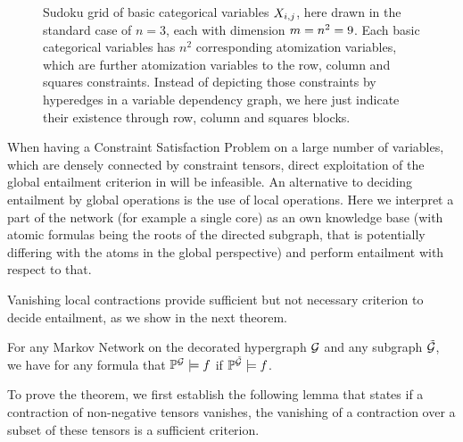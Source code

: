 \begin{example}[Sudoku]
    \begin{figure}
        \begin{center}
            
        \end{center}
        \caption{
            Sudoku grid of basic categorical variables $X_{i,j}$, here drawn in the standard case of $n=3$, each with dimension $m=n^2=9$.
            Each basic categorical variables has $n^2$ corresponding atomization variables, which are further atomization variables to the row, column and squares constraints.
            Instead of depicting those constraints by hyperedges in a variable dependency graph, we here just indicate their existence through row, column and squares blocks.
        }\label{fig:sudokuGrid}
    \end{figure}
\end{example}




\label{subsec:LocalEntailment}

When having a Constraint Satisfaction Problem on a large number of variables, which are densely connected by constraint tensors, direct exploitation of the global entailment criterion in  will be infeasible.
An alternative to deciding entailment by global operations is the use of local operations.
Here we interpret a part of the network (for example a single core) as an own knowledge base (with atomic formulas being the roots of the directed subgraph, that is potentially differing with the atoms in the global perspective) and perform entailment with respect to that.


Vanishing local contractions provide sufficient but not necessary criterion to decide entailment, as we show in the next theorem.

\begin{theorem}
    \label{the:monotonEntailment}
    For any Markov Network on the decorated hypergraph $\mathcal{G}$ and any subgraph $\tilde{\mathcal{G}}$, we have for any formula that $\mathbb{P}^{\mathcal{G}}\models f$ if $\mathbb{P}^{\tilde{\mathcal{G}}}\models f$.
\end{theorem}

To prove the theorem, we first establish the following lemma that states if a contraction of non-negative tensors vanishes, the vanishing of a contraction over a subset of these tensors is a sufficient criterion.


